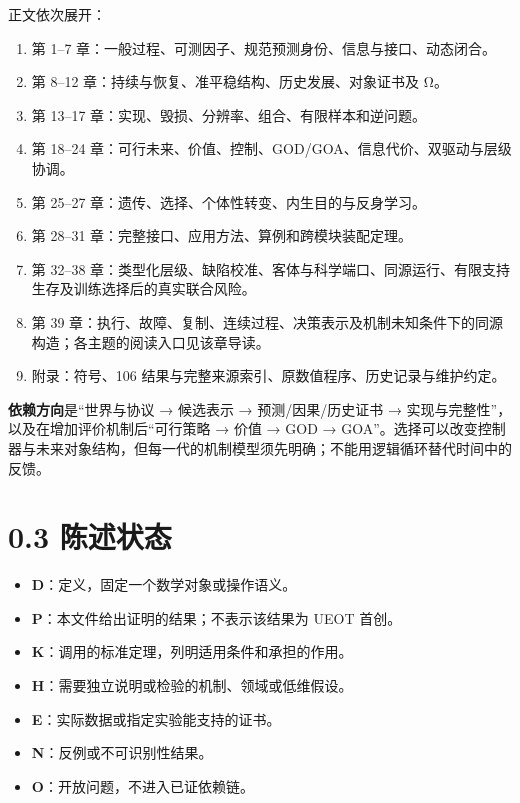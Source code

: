 \documentclass[
  11pt,
  oneside]{book}
\providecommand{\tightlist}{%
  \setlength{\itemsep}{0pt}\setlength{\parskip}{0pt}}
\begin{document}
正文依次展开：

\begin{enumerate}
\def\labelenumi{\arabic{enumi}.}
\tightlist
\item
  第 1--7 章：一般过程、可测因子、规范预测身份、信息与接口、动态闭合。
\item
  第 8--12 章：持续与恢复、准平稳结构、历史发展、对象证书及 Ω。
\item
  第 13--17 章：实现、毁损、分辨率、组合、有限样本和逆问题。
\item
  第 18--24 章：可行未来、价值、控制、GOD/GOA、信息代价、双驱动与层级协调。
\item
  第 25--27 章：遗传、选择、个体性转变、内生目的与反身学习。
\item
  第 28--31 章：完整接口、应用方法、算例和跨模块装配定理。
\item
  第 32--38 章：类型化层级、缺陷校准、客体与科学端口、同源运行、有限支持生存及训练选择后的真实联合风险。
\item
  第 39 章：执行、故障、复制、连续过程、决策表示及机制未知条件下的同源构造；各主题的阅读入口见该章导读。
\item
  附录：符号、106 结果与完整来源索引、原数值程序、历史记录与维护约定。
\end{enumerate}

\textbf{依赖方向}是``世界与协议 → 候选表示 → 预测/因果/历史证书 → 实现与完整性''，以及在增加评价机制后``可行策略 → 价值 → GOD → GOA''。选择可以改变控制器与未来对象结构，但每一代的机制模型须先明确；不能用逻辑循环替代时间中的反馈。

\section{0.3 陈述状态}\label{ux9648ux8ff0ux72b6ux6001}

\begin{itemize}
\tightlist
\item
  \textbf{D}：定义，固定一个数学对象或操作语义。
\item
  \textbf{P}：本文件给出证明的结果；不表示该结果为 UEOT 首创。
\item
  \textbf{K}：调用的标准定理，列明适用条件和承担的作用。
\item
  \textbf{H}：需要独立说明或检验的机制、领域或低维假设。
\item
  \textbf{E}：实际数据或指定实验能支持的证书。
\item
  \textbf{N}：反例或不可识别性结果。
\item
  \textbf{O}：开放问题，不进入已证依赖链。
\end{itemize}
\end{document}
